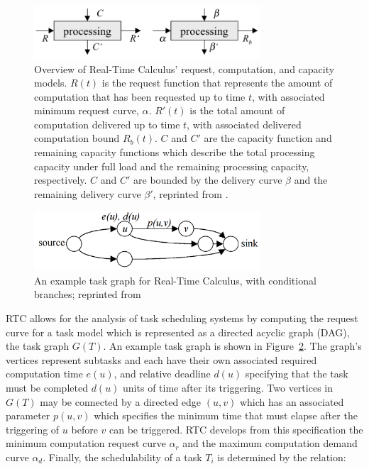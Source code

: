 \begin{figure}[htb]
  \centering
  \includegraphics[width=0.75\textwidth]{figs/rtc_overview.png}
  \caption{Overview of Real-Time Calculus' request, computation, and
    capacity models.  $R(t)$ is the request function that represents
    the amount of computation that has been requested up to time $t$,
    with associated minimum request curve, $\alpha$.  $R'(t)$ is the
    total amount of computation delivered up to time $t$, with
    associated delivered computation bound $R_b(t)$.  $C$ and $C'$ are
    the capacity function and remaining capacity functions which
    describe the total processing capacity under full load and the
    remaining processing capacity, respectively.  $C$ and $C'$ are
    bounded by the delivery curve $\beta$ and the remaining delivery
    curve $\beta'$, reprinted from \cite{Thiele00real-timecalculus}.}
  \label{fig:rtc_overview}
\end{figure}

\begin{figure}[htb]
  \centering
  \includegraphics[width=0.75\textwidth]{figs/task_graph.png}
  \caption{An example task graph for Real-Time Calculus, with
    conditional branches; reprinted from
    \cite{Thiele00real-timecalculus}}
  \label{fig:task_graph}
\end{figure}

RTC allows for the analysis of task scheduling systems by computing
the request curve for a task model which is represented as a directed
acyclic graph (DAG), the task graph $G(T)$.  An example task graph is
shown in Figure~\ref{fig:task_graph}.  The graph's vertices represent
subtasks and each have their own associated required computation time
$e(u)$, and relative deadline $d(u)$ specifying that the task must be
completed $d(u)$ units of time after its triggering.  Two vertices in
$G(T)$ may be connected by a directed edge $(u,v)$ which has an
associated parameter $p(u,v)$ which specifies the minimum time that
must elapse after the triggering of $u$ before $v$ can be triggered.
RTC develops from this specification the minimum computation request
curve $\alpha_r$ and the maximum computation demand curve $\alpha_d$.
Finally, the schedulability of a task $T_i$ is determined by the
relation:


